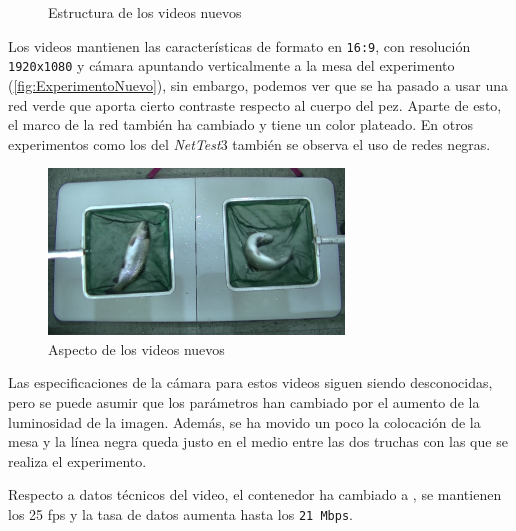 \begin{figure}[h]
    \centering
    \begin{subfigure}[b]{0.5\textwidth}
    \end{subfigure}
    \caption{Estructura de los  videos nuevos}
    \label{fig:EstrucutraNuevos}
\end{figure}

Los videos mantienen las características de formato en \texttt{16:9}, con resolución \texttt{1920x1080} y cámara apuntando verticalmente a la mesa del experimento 
(\autoref{fig:ExperimentoNuevo}), sin embargo, podemos ver que se ha pasado a usar una red verde que aporta cierto contraste respecto al cuerpo del pez. Aparte de esto, 
el marco de la red también ha cambiado y tiene un color plateado. En otros experimentos como los del \textit{NetTest}3 también se observa el uso de redes negras.

\begin{figure}[H]
    \centering
    \includegraphics[width=0.7\textwidth]{images/3/ExperimentoNuevo.png}
    \caption{Aspecto de los videos nuevos}
    \label{fig:ExperimentoNuevo}
\end{figure}

Las especificaciones de la cámara para estos videos siguen siendo desconocidas, pero se puede asumir que los parámetros han cambiado por el aumento de la luminosidad de la imagen.
Además, se ha movido un poco la colocación de la mesa y la línea negra queda justo en el medio entre las dos truchas con las que se realiza el experimento.

Respecto a datos técnicos del video, el contenedor ha cambiado a \texttt{}, se mantienen los 25 \acrshort{fps} y la tasa de datos aumenta hasta los \texttt{21 Mbps}.

